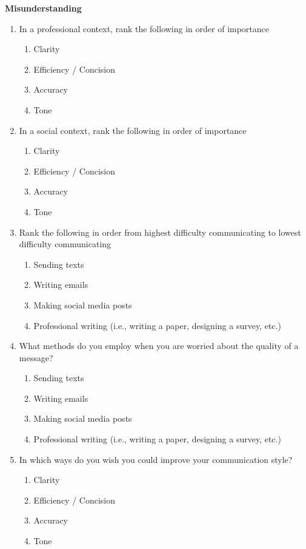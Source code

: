 \documentclass[acmsmall,screen,authorversion,nonacm]{acmart}
\begin{document}
\textbf{Misunderstanding}
\begin{enumerate}
    \item In a professional context, rank the following in order of importance
        \begin{enumerate}
            \item Clarity
            \item Efficiency / Concision
            \item Accuracy
            \item Tone
        \end{enumerate}
    \item In a social context, rank the following in order of importance
        \begin{enumerate}
            \item Clarity
            \item Efficiency / Concision
            \item Accuracy
            \item Tone
        \end{enumerate}
    \item Rank the following in order from highest difficulty communicating to lowest difficulty communicating
        \begin{enumerate}
            \item Sending texts
            \item Writing emails
            \item Making social media posts
            \item Professional writing (i.e., writing a paper, designing a survey, etc.)
        \end{enumerate}
    \item What methods do you employ when you are worried about the quality of a message?
        \begin{enumerate}
            \item Sending texts
            \item Writing emails
            \item Making social media posts
            \item Professional writing (i.e., writing a paper, designing a survey, etc.)
        \end{enumerate}
    \item In which ways do you wish you could improve your communication style?
        \begin{enumerate}
            \item Clarity
            \item Efficiency / Concision
            \item Accuracy
            \item Tone
        \end{enumerate}
\end{enumerate}
\end{document}
